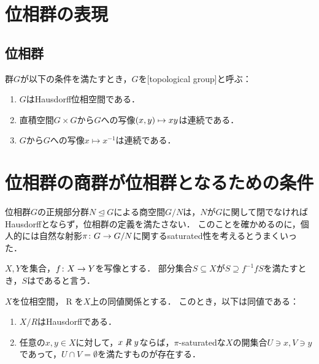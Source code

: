 \documentclass{jlreq}
\begin{document}
\section{位相群の表現}

\subsection{位相群}

\begin{definition}\label{def:top_gp}
  群$G$が以下の条件を満たすとき，$G$を[topological group]と呼ぶ：
  \begin{enumerate}
    \item $G$はHausdorff位相空間である．
    \item 直積空間$G \times G$から$G$への写像$\tuple{x, y} \mapsto xy$は連続である．
    \item $G$から$G$への写像$x \mapsto x^{-1}$は連続である．
  \end{enumerate}
\end{definition}

\section{位相群の商群が位相群となるための条件}

位相群$G$の正規部分群$N \trianglelefteq G$による商空間$G/N$は，$N$が$G$に関して閉でなければHausdorffとならず，位相群の定義を満たさない．
このことを確かめるのに，個人的には自然な射影$\pi \colon G \to G/N$に関するsaturated性を考えるとうまくいった．

\begin{definition}
  $X, Y$を集合，$f \colon X \to Y$を写像とする．
  部分集合$S \subseteq X$が$S \supseteq f^{-1} f S$を満たすとき，$S$はであると言う．
\end{definition}

\begin{lemma}\label{prop:cond_for_quotient_sp_is_hausdorff}
  $X$を位相空間，$\mathrel{R}$を$X$上の同値関係とする．
  このとき，以下は同値である：
  \begin{enumerate}
    \item\label{item:quotient_is_hausdorff} $X/R$はHausdorffである．
    \item\label{item:proj_hausdorff} 任意の$x, y \in X$に対して，$x \not\mathrel{R} y$ならば，$\pi$-saturatedな$X$の開集合$U \ni x, V \ni y$であって，$U \cap V = \emptyset$を満たすものが存在する．
  \end{enumerate}
\end{lemma}
\end{document}

